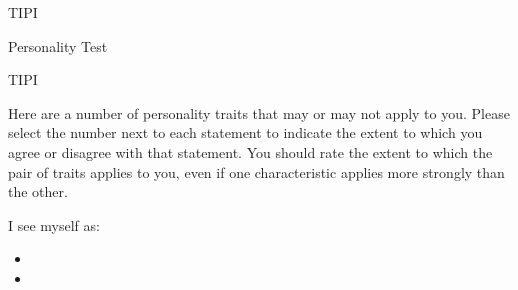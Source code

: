 
\begin{edXchapter}{TIPI}


\begin{edXsection}{Personality Test}

\begin{edXproblem}{TIPI}

Here are a number of personality traits that may or may not apply to you.  Please select the number next to each statement to indicate the extent to which you agree or disagree with that statement. You should rate the extent to which the pair of traits applies to you, even if one characteristic applies more strongly than the other.           
 
I see myself as:

\begin{itemize}
\item {} 

\item {} 

\end{itemize}
%


\end{edXproblem}
\end{edXsection}
\end{edXchapter}
